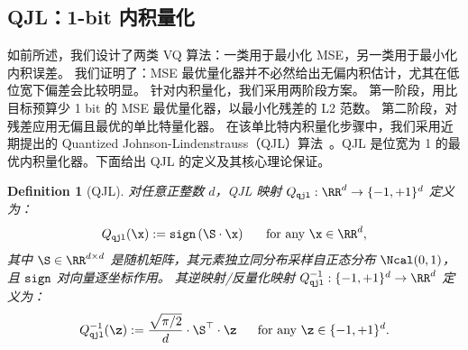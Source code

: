 \documentclass[11pt]{ctexart}
\newtheorem{definition}{Definition}
\begin{document}
\subsection{QJL：1-bit 内积量化}
如前所述，我们设计了两类 VQ 算法：一类用于最小化 MSE，另一类用于最小化内积误差。
我们证明了：MSE 最优量化器并不必然给出无偏内积估计，尤其在低位宽下偏差会比较明显。
针对内积量化，我们采用两阶段方案。
第一阶段，用比目标预算少 1 bit 的 MSE 最优量化器，以最小化残差的 L2 范数。
第二阶段，对残差应用无偏且最优的单比特量化器。
在该单比特内积量化步骤中，我们采用近期提出的 Quantized Johnson-Lindenstrauss（QJL）算法~\cite{qjl}。QJL 是位宽为 1 的最优内积量化器。下面给出 QJL 的定义及其核心理论保证。
\begin{definition}[QJL]\label{def_qjl}
对任意正整数 $d$，QJL 映射 $Q_{\tt qjl}: \RR^d \to \{ -1, +1 \}^d$ 定义为：
\[
Q_{\tt qjl}(\x) := {\tt sign} \left( \S \cdot \x \right) ~~~~\text{ for any } \x \in \RR^d,
\]
其中 $\S \in \RR^{d \times d}$ 是随机矩阵，其元素独立同分布采样自正态分布 $\Ncal(0, 1)$，且 ${\tt sign}$ 对向量逐坐标作用。
其逆映射/反量化映射 $Q_{\tt qjl}^{-1}: \{ -1, +1\}^d \to \RR^d$ 定义为：
\[
Q_{\tt qjl}^{-1}(\z) := \frac{\sqrt{\pi/2}}{d} \cdot \S^\top \cdot \z ~~~~\text{ for any } \z \in \{ -1, +1\}^d.
\]
\end{definition}
\end{document}
